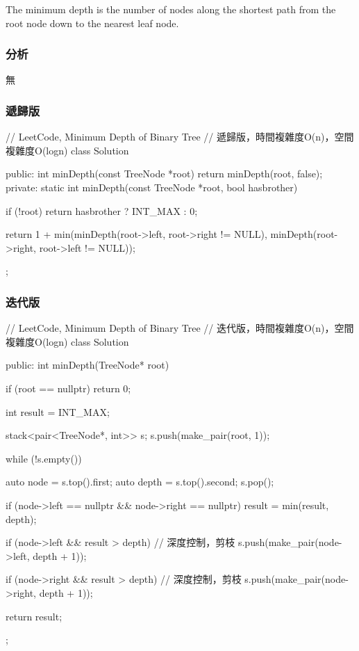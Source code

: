 The minimum depth is the number of nodes along the shortest path from the root node down to the nearest leaf node.


\subsubsection{分析}
無


\subsubsection{遞歸版}
\begin{Code}
// LeetCode, Minimum Depth of Binary Tree
// 遞歸版，時間複雜度O(n)，空間複雜度O(logn)
class Solution {
public:
    int minDepth(const TreeNode *root) {
        return minDepth(root, false);
    }
private:
    static int minDepth(const TreeNode *root, bool hasbrother) {
        if (!root) return hasbrother ? INT_MAX : 0;

        return 1 + min(minDepth(root->left, root->right != NULL),
                minDepth(root->right, root->left != NULL));
    }
};
\end{Code}


\subsubsection{迭代版}
\begin{Code}
// LeetCode, Minimum Depth of Binary Tree
// 迭代版，時間複雜度O(n)，空間複雜度O(logn)
class Solution {
public:
    int minDepth(TreeNode* root) {
        if (root == nullptr)
            return 0;

        int result = INT_MAX;

        stack<pair<TreeNode*, int>> s;
        s.push(make_pair(root, 1));

        while (!s.empty()) {
            auto node = s.top().first;
            auto depth = s.top().second;
            s.pop();

            if (node->left == nullptr && node->right == nullptr)
                result = min(result, depth);

            if (node->left && result > depth) // 深度控制，剪枝
                s.push(make_pair(node->left, depth + 1));

            if (node->right && result > depth) // 深度控制，剪枝
                s.push(make_pair(node->right, depth + 1));
        }

        return result;
    }
};
\end{Code}

